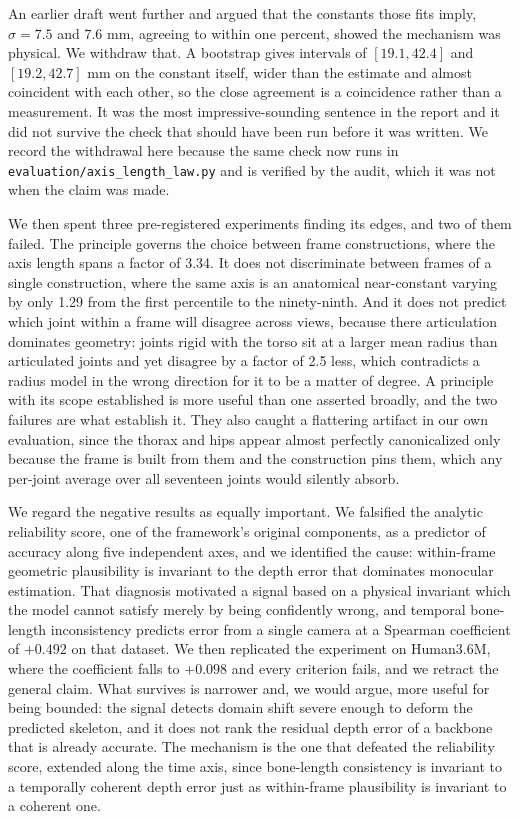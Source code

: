 \documentclass[12pt,a4paper]{report}
\begin{document}
An earlier draft went further and argued that the constants those fits imply, $\sigma = 7.5$ and $7.6$ mm, agreeing to within one percent, showed the mechanism was physical. We withdraw that. A bootstrap gives intervals of $[19.1, 42.4]$ and $[19.2, 42.7]$ mm on the constant itself, wider than the estimate and almost coincident with each other, so the close agreement is a coincidence rather than a measurement. It was the most impressive-sounding sentence in the report and it did not survive the check that should have been run before it was written. We record the withdrawal here because the same check now runs in \texttt{evaluation/axis\_length\_law.py} and is verified by the audit, which it was not when the claim was made.

We then spent three pre-registered experiments finding its edges, and two of them failed. The principle governs the choice between frame constructions, where the axis length spans a factor of 3.34. It does not discriminate between frames of a single construction, where the same axis is an anatomical near-constant varying by only 1.29 from the first percentile to the ninety-ninth. And it does not predict which joint within a frame will disagree across views, because there articulation dominates geometry: joints rigid with the torso sit at a larger mean radius than articulated joints and yet disagree by a factor of 2.5 less, which contradicts a radius model in the wrong direction for it to be a matter of degree. A principle with its scope established is more useful than one asserted broadly, and the two failures are what establish it. They also caught a flattering artifact in our own evaluation, since the thorax and hips appear almost perfectly canonicalized only because the frame is built from them and the construction pins them, which any per-joint average over all seventeen joints would silently absorb.

We regard the negative results as equally important. We falsified the analytic reliability score, one of the framework's original components, as a predictor of accuracy along five independent axes, and we identified the cause: within-frame geometric plausibility is invariant to the depth error that dominates monocular estimation. That diagnosis motivated a signal based on a physical invariant which the model cannot satisfy merely by being confidently wrong, and temporal bone-length inconsistency predicts error from a single camera at a Spearman coefficient of $+0.492$ on that dataset. We then replicated the experiment on Human3.6M, where the coefficient falls to $+0.098$ and every criterion fails, and we retract the general claim. What survives is narrower and, we would argue, more useful for being bounded: the signal detects domain shift severe enough to deform the predicted skeleton, and it does not rank the residual depth error of a backbone that is already accurate. The mechanism is the one that defeated the reliability score, extended along the time axis, since bone-length consistency is invariant to a temporally coherent depth error just as within-frame plausibility is invariant to a coherent one.
\end{document}
